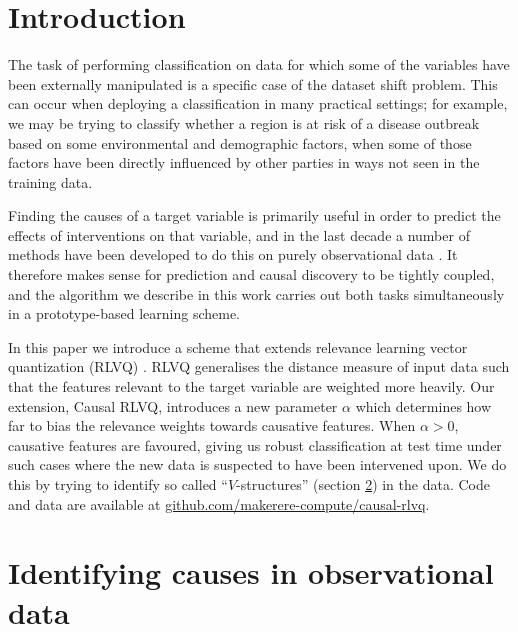 \documentclass{esannV2}
\begin{document}
\section{Introduction}
\label{sec:Introduction}

The task of performing classification on data for which some of the variables have been externally manipulated is a specific case of the dataset shift problem. This can occur when deploying a classification in many practical settings; for example, we may be trying to classify whether a region is at risk of a disease outbreak based on some environmental and demographic factors, when some of those factors have been directly influenced by other parties in ways not seen in the training data.

Finding the causes of a target variable is primarily useful in order to predict the effects of interventions on that variable, and in the last decade a number of methods have been developed to do this on purely observational data \cite{06}. It therefore makes sense for prediction and causal discovery to be tightly coupled, and the algorithm we describe in this work carries out both tasks simultaneously in a prototype-based learning scheme.

In this paper we introduce a scheme that extends relevance learning vector quantization (RLVQ) \cite{08}. RLVQ generalises the distance measure of input data such that the features relevant to the target variable are weighted more heavily. Our extension, Causal RLVQ, introduces a new parameter $\alpha$ which determines how far to bias the relevance weights towards causative features. When $\alpha>0$, causative features are favoured, giving us robust classification at test time under such cases where the new data is suspected to have been intervened upon. We do this by trying to identify so called ``$V$-structures'' (section \ref{sec:IdentifyingCausesInObservationalData}) in the data. Code and data are available at \url{github.com/makerere-compute/causal-rlvq}.


\section{Identifying causes in observational data}
\label{sec:IdentifyingCausesInObservationalData}
\end{document}
